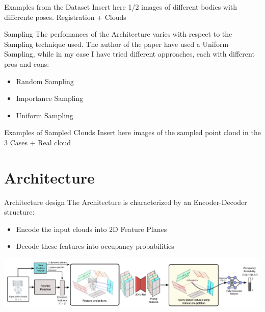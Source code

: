 \documentclass{beamer}
\begin{document}
\begin{frame}{Examples from the Dataset}
Insert here 1/2 images of different bodies with differente poses. Registration + Clouds
\end{frame}

\begin{frame}{Sampling}
    The perfomances of the Architecture varies with respect to the Sampling technique used. The author of the paper have used a Uniform Sampling, while in my case I have tried different approaches, each with different pros and cons:
    \begin{itemize}
    \item Random Sampling
    \item Importance Sampling
    \item Uniform Sampling
    \end{itemize}
\end{frame}

\begin{frame}{Examples of Sampled Clouds}
Insert here images of the sampled point cloud in the 3 Cases + Real cloud
\end{frame}

\section{Architecture}

\begin{frame}{Architecture design}
The Architecture is characterized by an Encoder-Decoder structure:
\begin{itemize}
\item Encode the input clouds into 2D Feature Planes
\item Decode these features into occupancy probabilities
\end{itemize}
\includegraphics[width=\textwidth]{../media/architecture.png}
\end{frame}
\end{document}
